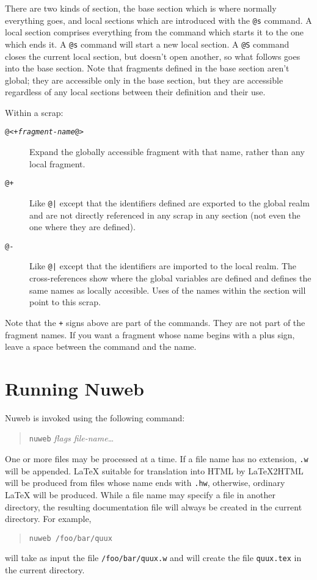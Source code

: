\documentclass[a4paper]{report}
\begin{document}
There are two kinds of section, the base section which is where
normally everything goes, and local sections which are introduced with
the {\tt @s} command. A local section comprises everything from the
command which starts it to the one which ends it. A {\tt @s} command
will start a new local section. A {\tt @S} command closes the current
local section, but doesn't open another, so what follows goes into the
base section. Note that fragments defined in the base section aren't
global; they are accessible only in the base section, but they are
accessible regardless of any local sections between their definition
and their use.

Within a scrap:
\begin{description}
\item[\tt @<+{\em fragment-name\/}@>]
Expand the globally accessible fragment with that name, rather than
any local fragment.
\item[{\tt @+}] Like \verb"@|" except that the identifiers
defined are exported to the global realm and are not directly
referenced in any scrap in any section (not even the one where
they are defined).
\item[{\tt @-}] Like \verb"@|" except that the identifiers
are imported to the local realm. The cross-references show where
the global variables are defined and defines the same names as
locally accesible. Uses of the names within the section will
point to this scrap.
\end{description}

Note that the \verb"+" signs above are part of the commands. They
are not part of the fragment names. If you want a fragment whose name
begins with a plus sign, leave a space between the command and the
name.

\section{Running Nuweb}

Nuweb is invoked using the following command:
\begin{quote}
{\tt nuweb} {\em flags file-name}\ldots
\end{quote}
One or more files may be processed at a time. If a file name has no
extension, \verb|.w| will be appended.  {\LaTeX} suitable for
translation into HTML by {\LaTeX}2HTML will be produced from
files whose name ends with \verb|.hw|, otherwise, ordinary {\LaTeX} will be
produced.  While a file name may specify a file in another directory,
the resulting documentation file will always be created in the current
directory. For example,
\begin{quote}
{\tt nuweb /foo/bar/quux}
\end{quote}
will take as input the file \verb|/foo/bar/quux.w| and will create the
file \verb|quux.tex| in the current directory.
\end{document}
